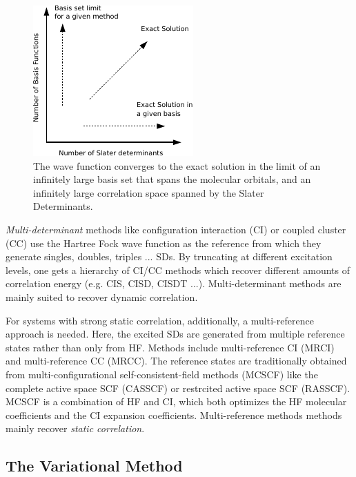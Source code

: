 \begin{figure}
\centering
\includegraphics[scale=2.0]{Pics/standardmodel}
\caption{The wave function converges to the exact solution in the limit of an infinitely large basis set that spans the molecular orbitals, and an infinitely large correlation space spanned by the Slater Determinants.}
\label{fig:STANDARDMODEL}
\end{figure}

\emph{Multi-determinant} methods like configuration interaction (CI) or coupled cluster (CC) use the Hartree Fock wave function as the reference from which they generate singles, doubles, triples ... SDs. By truncating at different excitation levels, one gets a hierarchy of CI/CC methods which recover different amounts of correlation energy (e.g. CIS, CISD, CISDT ...). Multi-determinant methods are mainly suited to recover dynamic correlation.

For systems with strong static correlation, additionally, a multi-reference approach is needed. Here, the excited SDs are generated from multiple reference states rather than only from HF. Methods include multi-reference CI (MRCI) and multi-reference CC (MRCC). The reference states are traditionally obtained from multi-configurational self-consistent-field methods (MCSCF) like the complete active space SCF (CASSCF) or restrcited active space SCF (RASSCF). MCSCF is a combination of HF and CI, which both optimizes the HF molecular coefficients and the CI expansion coefficients. Multi-reference methods methods mainly recover \emph{static correlation}. 

\subsection{The Variational Method}


